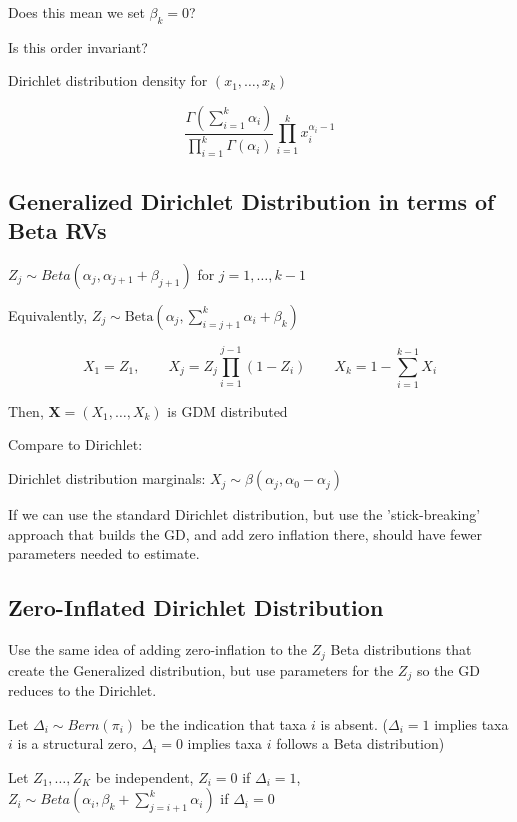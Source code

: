 \documentclass[10pt]{article}
\theoremstyle{definition}
\begin{document}
Does this mean we set $\beta_k = 0$?

Is this order invariant?

Dirichlet distribution density for $(x_1, \ldots, x_k )$

$$\frac{\Gamma(\sum_{i=1}^k\alpha_i)}{\prod_{i =1}^k \Gamma(\alpha_i)} \prod_{i = 1}^k x_i^{\alpha_i - 1}$$

\newpage
\hrulefill

\subsection{Generalized Dirichlet Distribution in terms of Beta RVs}


$Z_j \sim Beta(\alpha_j, \alpha_{j + 1} + \beta_{j + 1})$ for $j = 1, \ldots , k-1$



Equivalently, $Z_j \sim  \text{Beta}(\alpha_j, \sum_{i = j +1}^{k} \alpha_i + \beta_k)$


$$X_1 = Z_1, \qquad X_j = Z_j \prod_{i = 1}^{j-1} (1-Z_i) \qquad X_k = 1 - \sum_{i=1}^{k-1} X_i$$



Then, $\mathbf{X} = (X_1, \ldots , X_k)$ is GDM distributed


Compare to Dirichlet:

Dirichlet distribution marginals: $X_j \sim \beta(\alpha_j, \alpha_0 - \alpha_j)$





If we can use the standard Dirichlet distribution, but use the 'stick-breaking' approach that builds the GD, and add zero inflation there, should have fewer parameters needed to estimate.


\hrulefill

\subsection{Zero-Inflated Dirichlet Distribution}

Use the same idea of adding zero-inflation to the $Z_j$ Beta distributions that create the Generalized distribution, but use parameters for the $Z_j$ so the GD reduces to the Dirichlet.


Let $\Delta_i \sim Bern(\pi_i)$ be the indication that taxa $i$ is absent. ($\Delta_i = 1$ implies taxa $i$ is a structural zero, $\Delta_i = 0$ implies taxa $i$ follows a Beta distribution)

Let $Z_1, \ldots , Z_K$ be independent, $Z_i = 0$ if $\Delta_i = 1$,  $Z_i \sim Beta(\alpha_i, \beta_k + \sum_{j = i+1}^k \alpha_i)$ if $\Delta_i = 0$
\end{document}
